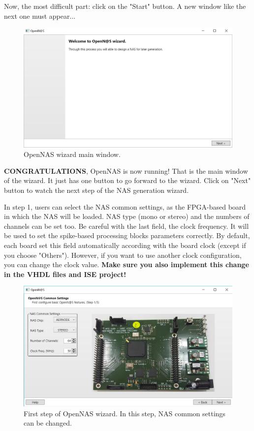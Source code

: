 Now, the most difficult part: click on the "Start" button. A new window like the next one must appear...

\begin{figure}[H]
\centering
\includegraphics[width=1\textwidth]{images/Img13_VS_Init_App.PNG}
\caption{\label{fig:OpenNAS_Wizard_Welcome}OpenNAS wizard main window.}
\end{figure}

\textbf{CONGRATULATIONS}, OpenNAS is now running! That is the main window of the wizard. It just has one button to go forward to the wizard. Click on "Next" button to watch the next step of the NAS generation wizard.

In step 1, users can select the NAS common settings, as the FPGA-based board in which the NAS will be loaded. NAS type (mono or stereo) and the numbers of channels can be set too. Be careful with the last field, the clock frequency. It will be used to set the spike-based processing blocks parameters correctly. By default, each board set this field automatically according with the board clock (except if you choose "Others"). However, if you want to use another clock configuration, you can change the clock value. \textbf{Make sure you also implement this change in the VHDL files and ISE project!}

\begin{figure}[H]
\centering
\includegraphics[width=1\textwidth]{images/Img14_VS_Step1.PNG}
\caption{\label{fig:OpenNAS_common_settings}First step of OpenNAS wizard. In this step, NAS common settings can be changed.}
\end{figure}

